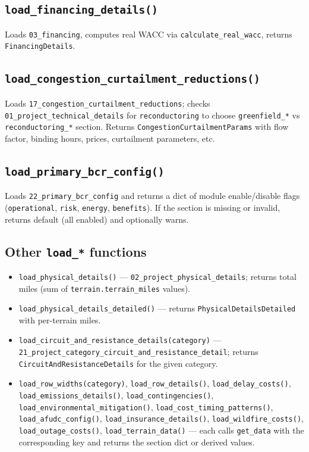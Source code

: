 \documentclass[ctcc_full_documentation.tex]{subfiles}
\begin{document}
\subsection{\texttt{load\_financing\_details()}}

Loads \texttt{03\_financing}, computes real WACC via \texttt{calculate\_real\_wacc}, returns \texttt{FinancingDetails}.

\subsection{\texttt{load\_congestion\_curtailment\_reductions()}}

Loads \texttt{17\_congestion\_curtailment\_reductions}; checks \texttt{01\_project\_technical\_details} for \texttt{reconductoring} to choose \texttt{greenfield\_*} vs \texttt{reconductoring\_*} section. Returns \texttt{CongestionCurtailmentParams} with flow factor, binding hours, prices, curtailment parameters, etc.

\subsection{\texttt{load\_primary\_bcr\_config()}}

Loads \texttt{22\_primary\_bcr\_config} and returns a dict of module enable/disable flags (\texttt{operational}, \texttt{risk}, \texttt{energy}, \texttt{benefits}). If the section is missing or invalid, returns default (all enabled) and optionally warns.

\subsection{Other \texttt{load\_*} functions}

\begin{itemize}
    \item \texttt{load\_physical\_details()} --- \texttt{02\_project\_physical\_details}; returns total miles (sum of \texttt{terrain.terrain\_miles} values).
    \item \texttt{load\_physical\_details\_detailed()} --- returns \texttt{PhysicalDetailsDetailed} with per-terrain miles.
    \item \texttt{load\_circuit\_and\_resistance\_details(category)} --- \texttt{21\_project\_category\_circuit\_and\_resistance\_detail}; returns \texttt{CircuitAndResistanceDetails} for the given category.
    \item \texttt{load\_row\_widths(category)}, \texttt{load\_row\_details()}, \texttt{load\_delay\_costs()}, \texttt{load\_emissions\_details()}, \texttt{load\_contingencies()}, \texttt{load\_environmental\_mitigation()}, \texttt{load\_cost\_timing\_patterns()}, \texttt{load\_afudc\_config()}, \texttt{load\_insurance\_details()}, \texttt{load\_wildfire\_costs()}, \texttt{load\_outage\_costs()}, \texttt{load\_terrain\_data()} --- each calls \texttt{get\_data} with the corresponding key and returns the section dict or derived values.
\end{itemize}
\end{document}
